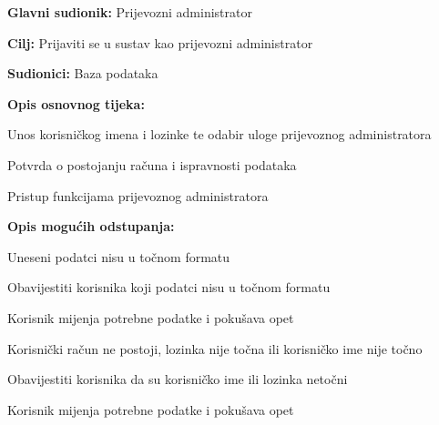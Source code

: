 				\noindent {}
				\begin{packed_item}
					
					\item \textbf{Glavni sudionik: }Prijevozni administrator
					\item  \textbf{Cilj:} Prijaviti se u sustav kao prijevozni administrator
					\item  \textbf{Sudionici:} Baza podataka
					\item  \textbf{Opis osnovnog tijeka:}
					
					\item[] \begin{packed_enum}
						
						\item Unos korisničkog imena i lozinke te odabir uloge prijevoznog administratora
						\item Potvrda o postojanju računa i ispravnosti podataka
						\item Pristup funkcijama prijevoznog administratora
					\end{packed_enum}
					
					\item  \textbf{Opis mogućih odstupanja:}
					
					\item[] \begin{packed_item}
						
						\item[2.a] Uneseni podatci nisu u točnom formatu
						\item[] \begin{packed_enum}
							
							\item Obavijestiti korisnika koji podatci nisu u točnom formatu
							\item Korisnik mijenja potrebne podatke i pokušava opet
							
						\end{packed_enum}
						\item[2.b] Korisnički račun ne postoji, lozinka nije točna ili korisničko ime nije točno
						\item[] \begin{packed_enum}
							
							\item Obavijestiti korisnika da su korisničko ime ili lozinka netočni
							\item Korisnik mijenja potrebne podatke i pokušava opet
							
						\end{packed_enum}
						
						
					\end{packed_item}
				\end{packed_item}
				
